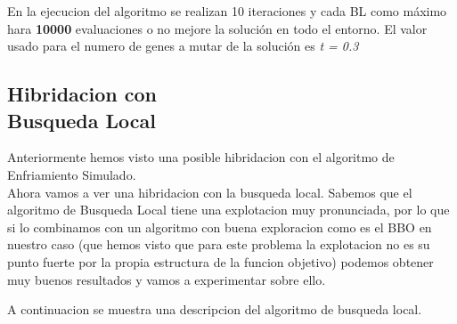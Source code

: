 \documentclass{article}
\begin{document}
En la ejecucion del algoritmo se realizan 10 iteraciones y cada BL como máximo hara \textbf{10000} evaluaciones
o no mejore la solución en todo el entorno.
El valor usado para el numero de genes a mutar de la solución es \emph{t = 0.3}

\newpage
\subsection{\normalsize Hibridacion con \\ Busqueda Local}
Anteriormente hemos visto una posible hibridacion con el algoritmo de Enfriamiento Simulado.\\
Ahora vamos a ver una hibridacion con la busqueda local. Sabemos que el algoritmo de Busqueda Local
tiene una explotacion muy pronunciada, por lo que si lo combinamos con un algoritmo con buena exploracion como es 
el BBO en nuestro caso (que hemos visto que para este problema la explotacion no es su punto fuerte por la propia estructura de la funcion objetivo)
podemos obtener muy buenos resultados y vamos a experimentar sobre ello.

A continuacion se muestra una descripcion del algoritmo de busqueda local.
\end{document}
